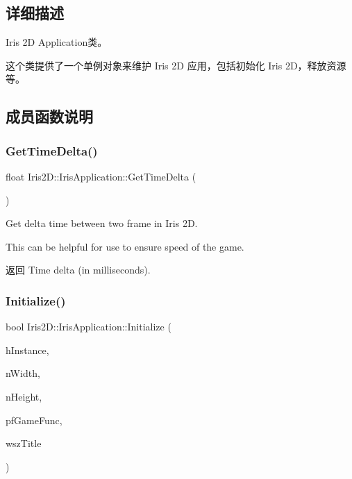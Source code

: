 \subsection{详细描述}
Iris 2D Application类。 

这个类提供了一个单例对象来维护 Iris 2D 应用，包括初始化 Iris 2\+D，释放资源等。 

\subsection{成员函数说明}
\mbox{\label{class_iris2_d_1_1_iris_application_a3b8f4de1902aeda08acbe243aad34f15}} 
\subsubsection{\texorpdfstring{Get\+Time\+Delta()}{GetTimeDelta()}}
{\footnotesize\ttfamily float Iris2\+D\+::\+Iris\+Application\+::\+Get\+Time\+Delta (\begin{DoxyParamCaption}{ }\end{DoxyParamCaption})}



Get delta time between two frame in Iris 2D. 

This can be helpful for use to ensure speed of the game. \begin{DoxyReturn}{返回}
Time delta (in milliseconds). 
\end{DoxyReturn}
\mbox{\label{class_iris2_d_1_1_iris_application_a84f3ddebb3a3ffb0c172bd41fb952e1a}} 
\subsubsection{\texorpdfstring{Initialize()}{Initialize()}\hspace{0.1cm}{\footnotesize\ttfamily [1/2]}}
{\footnotesize\ttfamily bool Iris2\+D\+::\+Iris\+Application\+::\+Initialize (\begin{DoxyParamCaption}\item[{H\+I\+N\+S\+T\+A\+N\+CE}]{h\+Instance,  }\item[{unsigned int}]{n\+Width,  }\item[{unsigned int}]{n\+Height,  }\item[{\hyperlink{class_iris2_d_1_1_iris_application_ac74720e6cd3a1968f73e92ea99675884}{Game\+Func}}]{pf\+Game\+Func,  }\item[{const std\+::wstring \&}]{wsz\+Title }\end{DoxyParamCaption})}



